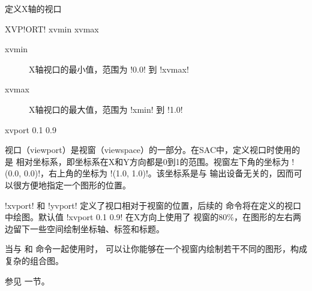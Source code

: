 \label{cmd:xvport}

定义X轴的视口

\begin{SACSTX}
XVP!ORT! xvmin xvmax
\end{SACSTX}

\begin{description}
\item [xvmin] X轴视口的最小值，范围为 !0.0! 到 !xvmax!
\item [xvmax] X轴视口的最大值，范围为 !xmin! 到 !1.0!
\end{description}

\begin{SACDFT}
xvport 0.1 0.9
\end{SACDFT}

视口（viewport）是视窗（viewspace）的一部分。在SAC中，定义视口时使用的是
相对坐标系，即坐标系在X和Y方向都是0到1的范围。视窗左下角的坐标为
!(0.0, 0.0)!，右上角的坐标为 !(1.0, 1.0)!。该坐标系是与
输出设备无关的，因而可以很方便地指定一个图形的位置。

!xvport! 和 !yvport! 定义了视口相对于视窗的位置，后续的
命令将在定义的视口中绘图。默认值 !xvport 0.1 0.9! 在X方向上使用了
视窗的80\%，在图形的左右两边留下一些空间绘制坐标轴、标签和标题。

当与  和  命令一起使用时，
可以让你能够在一个视窗内绘制若干不同的图形，构成复杂的组合图。

参见  一节。
